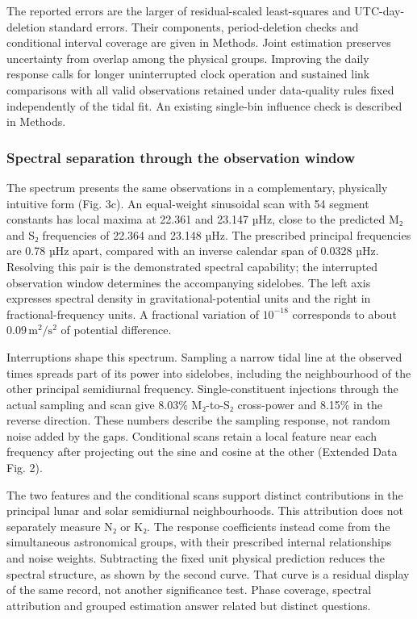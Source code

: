 \documentclass[
  10pt,
  a4paper,
]{article}
\begin{document}
The reported errors are the larger of residual-scaled least-squares and
UTC-day-deletion standard errors. Their components, period-deletion
checks and conditional interval coverage are given in Methods. Joint
estimation preserves uncertainty from overlap among the physical groups.
Improving the daily response calls for longer uninterrupted clock
operation and sustained link comparisons with all valid observations
retained under data-quality rules fixed independently of the tidal fit.
An existing single-bin influence check is described in Methods.

\hypertarget{spectral-separation-through-the-observation-window}{%
\subsubsection{Spectral separation through the observation
window}\label{spectral-separation-through-the-observation-window}}

The spectrum presents the same observations in a complementary,
physically intuitive form (Fig. 3c). An equal-weight sinusoidal scan
with 54 segment constants has local maxima at 22.361 and 23.147 µHz,
close to the predicted M₂ and S₂ frequencies of 22.364 and 23.148 µHz.
The prescribed principal frequencies are 0.78 µHz apart, compared with
an inverse calendar span of 0.0328 µHz. Resolving this pair is the
demonstrated spectral capability; the interrupted observation window
determines the accompanying sidelobes. The left axis expresses spectral
density in gravitational-potential units and the right in
fractional-frequency units. A fractional variation of \(10^{-18}\)
corresponds to about \(0.09\,\mathrm{m^2/s^2}\) of potential difference.

Interruptions shape this spectrum. Sampling a narrow tidal line at the
observed times spreads part of its power into sidelobes, including the
neighbourhood of the other principal semidiurnal frequency.
Single-constituent injections through the actual sampling and scan give
8.03\% M₂-to-S₂ cross-power and 8.15\% in the reverse direction. These
numbers describe the sampling response, not random noise added by the
gaps. Conditional scans retain a local feature near each frequency after
projecting out the sine and cosine at the other (Extended Data Fig. 2).

The two features and the conditional scans support distinct
contributions in the principal lunar and solar semidiurnal
neighbourhoods. This attribution does not separately measure N₂ or K₂.
The response coefficients instead come from the simultaneous
astronomical groups, with their prescribed internal relationships and
noise weights. Subtracting the fixed unit physical prediction reduces
the spectral structure, as shown by the second curve. That curve is a
residual display of the same record, not another significance test.
Phase coverage, spectral attribution and grouped estimation answer
related but distinct questions.
\end{document}

